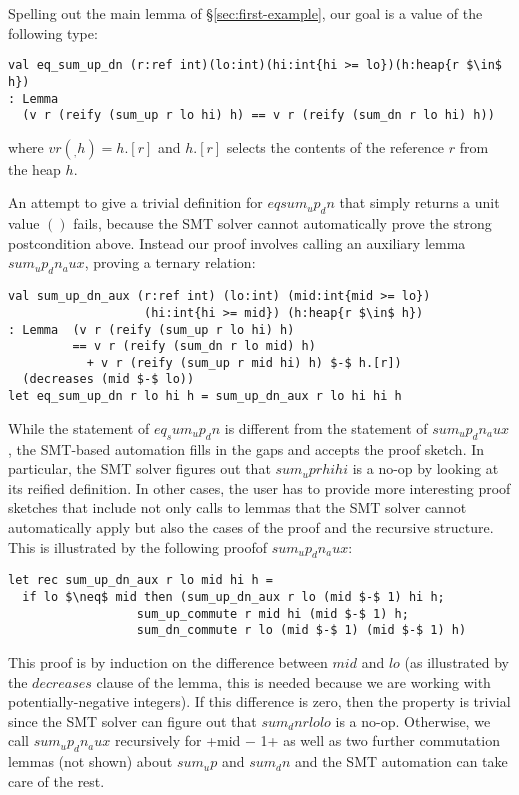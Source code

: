 \documentclass[sigplan,screen]{acmart}\settopmatter{}
\newcommand{\comm}[3]{\ifcheckpagebudget\else\ifdraft{\maybecolor{#1}[#2: #3]}\fi\fi}
\newcommand{\ch}[1]{\comm{teal}{CH}{#1}}
\begin{document}
Spelling out the main lemma of \S\ref{sec:first-example}, our goal is
a value of the following type:

\begin{lstlisting}
val eq_sum_up_dn (r:ref int)(lo:int)(hi:int{hi >= lo})(h:heap{r $\in$ h})
: Lemma 
  (v r (reify (sum_up r lo hi) h) == v r (reify (sum_dn r lo hi) h))
\end{lstlisting}
where \ls$v r (_, h) = h.[r]$ and \ls$h.[r]$ selects the contents of the
reference \ls$r$ from the heap \ls$h$.

An attempt to give a trivial definition
%
for \ls$eqsum_up_dn$ that simply returns a unit value
\ls$()$ fails, because the SMT solver
cannot automatically prove the strong postcondition above.
%
Instead our proof involves calling an auxiliary
lemma \ls$sum_up_dn_aux$, proving a ternary relation:
%
\begin{lstlisting}
val sum_up_dn_aux (r:ref int) (lo:int) (mid:int{mid >= lo}) 
                   (hi:int{hi >= mid}) (h:heap{r $\in$ h})
: Lemma  (v r (reify (sum_up r lo hi) h)
         == v r (reify (sum_dn r lo mid) h) 
           + v r (reify (sum_up r mid hi) h) $-$ h.[r])
  (decreases (mid $-$ lo))
let eq_sum_up_dn r lo hi h = sum_up_dn_aux r lo hi hi h
\end{lstlisting}
%
While the statement of \ls$eq_sum_up_dn$ is different from the
statement of \ls$sum_up_dn_aux$, the SMT-based automation fills in the
gaps and accepts the proof sketch.
%
In particular, the SMT solver figures out that \ls$sum_up r hi hi$ is
a no-op by looking at its reified definition.
\ifsooner\ch{Normalizer helps too here!}\fi
%
In other cases, the user has to provide more interesting proof sketches
that include not only calls to lemmas that the SMT solver cannot
automatically apply but also the cases of the proof and the recursive
structure.  This is illustrated by the \iffull\else following \fi
proof\iffull of \ls$sum_up_dn_aux$\fi:
%
\begin{lstlisting}
let rec sum_up_dn_aux r lo mid hi h =
  if lo $\neq$ mid then (sum_up_dn_aux r lo (mid $-$ 1) hi h;
                  sum_up_commute r mid hi (mid $-$ 1) h;
                  sum_dn_commute r lo (mid $-$ 1) (mid $-$ 1) h)
\end{lstlisting}
%
This proof is by induction on the difference between \ls$mid$ and
\ls$lo$ (as illustrated by the \ls$decreases$ clause of the lemma,
this is needed because we are working with potentially-negative integers). If
this difference is zero, then the property is trivial since the SMT
solver can figure out that \ls$sum_dn r lo lo$ is a no-op.
%
Otherwise, we call \ls$sum_up_dn_aux$ recursively for \ls+mid $-$ 1+ as
well as two further commutation lemmas (not shown) about \ls$sum_up$
and \ls$sum_dn$ and the SMT automation can take care of the rest.
\end{document}
